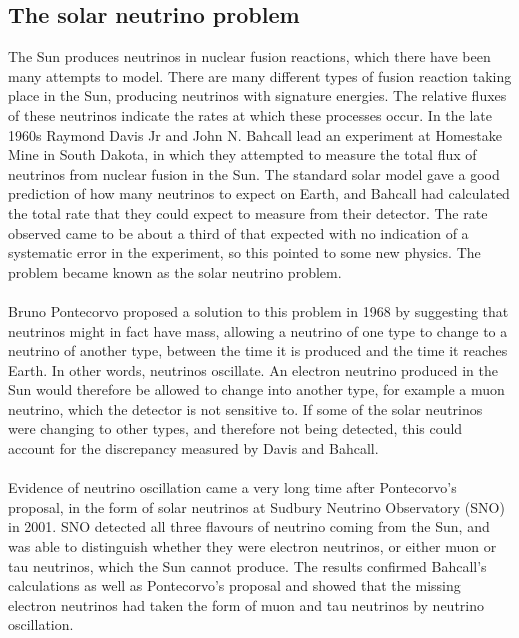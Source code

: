 \documentclass[12pt]{article}
\begin{document}
\subsection{The solar neutrino problem}
The Sun produces neutrinos in nuclear fusion reactions, which there have been many attempts to model. There are many different types of fusion reaction taking place in the Sun, producing neutrinos with signature energies. The relative fluxes of these neutrinos indicate the rates at which these processes occur. In the late 1960s Raymond Davis Jr and John N. Bahcall lead an experiment at Homestake Mine in South Dakota, in which they attempted to measure the total flux of neutrinos from nuclear fusion in the Sun. The standard solar model gave a good prediction of how many neutrinos to expect on Earth, and Bahcall had calculated the total rate that they could expect to measure from their detector. The rate observed came to be about a third of that expected with no indication of a systematic error in the experiment, so this pointed to some new physics\cite{Martin}. The problem became known as the solar neutrino problem.\\\\
Bruno Pontecorvo proposed a solution to this problem in 1968 by suggesting that neutrinos might in fact have mass, allowing a neutrino of one type to change to a neutrino of another type, between the time it is produced and the time it reaches Earth\cite{Pontecorvo}. In other words, neutrinos oscillate. An electron neutrino produced in the Sun would therefore be allowed to change into another type, for example a muon neutrino, which the detector is not sensitive to. If some of the solar neutrinos were changing to other types, and therefore not being detected, this could account for the discrepancy measured by Davis and Bahcall.\\\\
Evidence of neutrino oscillation came a very long time after Pontecorvo's proposal, in the form of solar neutrinos at Sudbury Neutrino Observatory (SNO) in 2001. SNO detected all three flavours of neutrino coming from the Sun, and was able to distinguish whether they were electron neutrinos, or either muon or tau neutrinos, which the Sun cannot produce. The results confirmed Bahcall's calculations as well as Pontecorvo's proposal and showed that the missing electron neutrinos had taken the form of muon and tau neutrinos by neutrino oscillation\cite{SNO1}.
\end{document}
